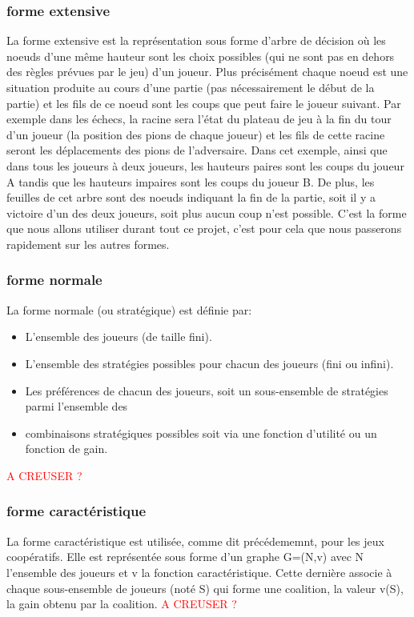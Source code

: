 \documentclass[a4paper, 12pt, french]{article}
\begin{document}
	\subsubsection{forme extensive}
	La forme extensive est la représentation sous forme d'arbre de décision où les noeuds d'une même hauteur sont les
	choix possibles (qui ne sont pas en dehors des règles prévues par le jeu) d'un joueur. Plus précisément chaque
	noeud est une situation produite au cours d'une partie (pas nécessairement le début de la partie) et les fils de
	ce noeud sont les coups que peut faire le joueur suivant. Par exemple dans les échecs, la racine sera l'état du
	plateau de jeu à la fin du tour d'un joueur (la position des pions de chaque joueur) et les fils de cette racine
	seront les déplacements des pions de l'adversaire. Dans cet exemple, ainsi que dans tous les joueurs à deux joueurs,
	les hauteurs paires sont les coups du joueur A tandis que les hauteurs impaires sont les coups du joueur B.
	De plus, les feuilles de cet arbre sont des noeuds indiquant la fin de la partie, soit il y a victoire d'un des
	deux joueurs, soit plus aucun coup n'est possible.
	C'est la forme que nous allons utiliser durant tout ce projet, c'est pour cela que nous passerons rapidement sur
	les autres formes.

	\subsubsection{forme normale}
	La forme normale (ou stratégique) est définie par:
	\begin{itemize}
		\item L'ensemble des joueurs (de taille fini).
		\item L'ensemble des stratégies possibles pour chacun des joueurs (fini ou infini).
		\item Les préférences de chacun des joueurs, soit un sous-ensemble de stratégies parmi l'ensemble des
		\item combinaisons stratégiques possibles soit via une fonction d'utilité ou un fonction de gain.
	\end{itemize}
	\textcolor{red}{A CREUSER ?}

	\subsubsection{forme caractéristique}
	La forme caractéristique est utilisée, comme dit précédememnt, pour les jeux coopératifs. Elle est représentée
	sous forme d'un graphe G=(N,v) avec N l'ensemble des joueurs et v la fonction caractéristique. Cette dernière
	associe à chaque sous-ensemble de joueurs (noté S) qui forme une coalition, la valeur v(S), la gain obtenu
	par la coalition. \textcolor{red}{A CREUSER ?}
\end{document}
